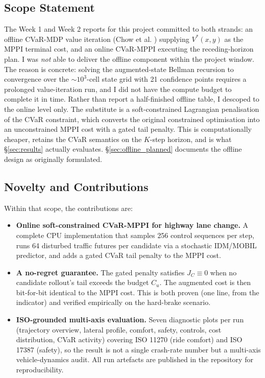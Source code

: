 \documentclass[letterpaper, 10 pt, conference]{ieeeconf}
\begin{document}
\subsection{Scope Statement}
\label{sec:scope}

The Week 1 and Week 2 reports for this project committed to both strands: an offline CVaR-MDP value iteration (Chow et al. \cite{chow2015risk}) supplying $V^*(x, y)$ as the MPPI terminal cost, and an online CVaR-MPPI executing the receding-horizon plan. I was \emph{not} able to deliver the offline component within the project window. The reason is concrete: solving the augmented-state Bellman recursion to convergence over the $\sim\!10^3$-cell state grid with 21 confidence points requires a prolonged value-iteration run, and I did not have the compute budget to complete it in time. Rather than report a half-finished offline table, I descoped to the online level only. The substitute is a soft-constrained Lagrangian penalisation of the CVaR constraint, which converts the original constrained optimisation into an unconstrained MPPI cost with a gated tail penalty. This is computationally cheaper, retains the CVaR semantics on the $K$-step horizon, and is what \S\ref{sec:results} actually evaluates. \S\ref{sec:offline_planned} documents the offline design as originally formulated.

\subsection{Novelty and Contributions}

Within that scope, the contributions are:

\begin{itemize}
    \item \textbf{Online soft-constrained CVaR-MPPI for highway lane change.} A complete CPU implementation that samples 256 control sequences per step, runs 64 disturbed traffic futures per candidate via a stochastic IDM/MOBIL predictor, and adds a gated CVaR tail penalty to the MPPI cost.
    \item \textbf{A no-regret guarantee.} The gated penalty satisfies $J_C \equiv 0$ when no candidate rollout's tail exceeds the budget $C_u$. The augmented cost is then bit-for-bit identical to the MPPI cost. This is both proven (one line, from the indicator) and verified empirically on the hard-brake scenario.
    \item \textbf{ISO-grounded multi-axis evaluation.} Seven diagnostic plots per run (trajectory overview, lateral profile, comfort, safety, controls, cost distribution, CVaR activity) covering ISO 11270 (ride comfort) and ISO 17387 (safety), so the result is not a single crash-rate number but a multi-axis vehicle-dynamics audit. All run artefacts are published in the repository for reproducibility.
\end{itemize}
\end{document}
